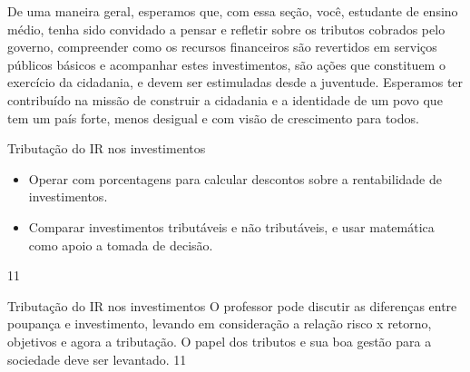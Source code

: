 De uma maneira geral, esperamos que, com essa seção, você, estudante de ensino médio, tenha sido convidado a pensar e refletir sobre os tributos cobrados pelo governo, compreender como os recursos financeiros são revertidos em serviços públicos básicos e acompanhar estes investimentos, são ações que constituem o exercício da cidadania, e devem ser  estimuladas desde a juventude. Esperamos ter contribuído na missão de construir a cidadania e a identidade de um povo que tem um país forte, menos desigual e com visão de crescimento para todos.

\clearpage
\def\currentcolor{session2}
\begin{objectives}{Tributação do IR nos investimentos}
{
\begin{itemize}
\item Operar com porcentagens para calcular descontos sobre a rentabilidade de investimentos.
\item Comparar investimentos tributáveis e não tributáveis, e usar matemática como apoio a tomada de decisão.
\end{itemize}
}{1}{1}
\end{objectives}
\begin{sugestions}{Tributação do IR nos investimentos}
{
O professor pode discutir as diferenças entre poupança e investimento, levando em consideração a relação risco x retorno, objetivos e agora a tributação. O papel dos tributos e sua boa gestão para a sociedade deve ser levantado.
}{1}{1}
\end{sugestions}
